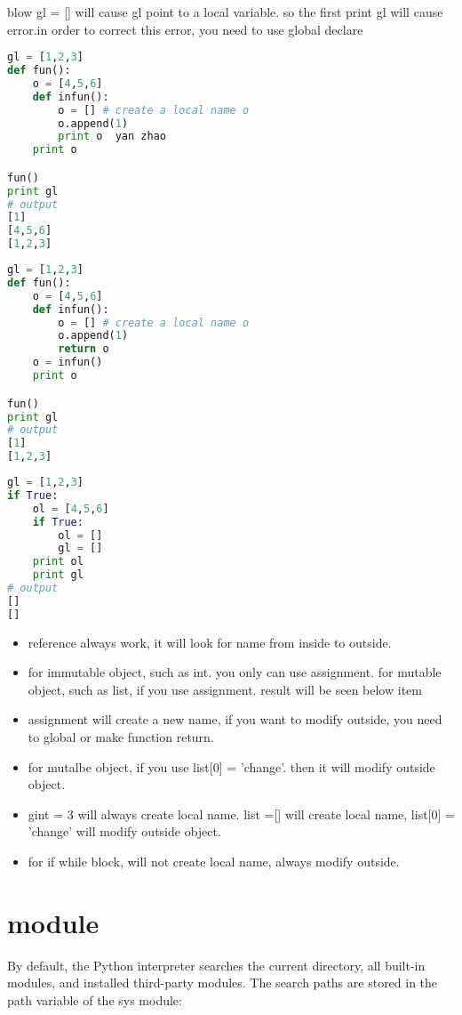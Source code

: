 \documentclass[a4paper,12pt,twoside]{book}
\begin{document}
blow gl = [] will cause gl point to a local variable. so the first print gl will cause error.in order to correct this error, you need to use global declare

\begin{lstlisting}[frame=single, language=python]
gl = [1,2,3]
def fun():
	o = [4,5,6]
	def infun():
		o = [] # create a local name o
		o.append(1)
		print o  yan zhao
	print o

fun()
print gl
# output 
[1]
[4,5,6]
[1,2,3]
\end{lstlisting}  

\begin{lstlisting}[frame=single, language=python]
gl = [1,2,3]
def fun():
	o = [4,5,6]
	def infun():
		o = [] # create a local name o
		o.append(1)
		return o
	o = infun()
	print o

fun()
print gl
# output 
[1]
[1,2,3]
\end{lstlisting}  


\begin{lstlisting}[frame=single, language=python]
gl = [1,2,3]
if True:
	ol = [4,5,6]
	if True:
		ol = []
		gl = []
	print ol
	print gl
# output 
[]
[]
\end{lstlisting}  

\begin{itemize}
		\item reference always work, it will look for name from inside to outside.
		\item for immutable object, such as int. you only can use assignment. for mutable object, such as list, if you use assignment. result will be seen below item
		\item assignment will create a new name, if you want to modify outside, you need to global or make function return.
		\item for mutalbe object, if you use list[0] = 'change'. then it will modify outside object.
		\item gint = 3 will always create local name. list =[] will create local name, list[0] = 'change' will modify outside object.
		\item for if while block, will not create local name, always modify outside. 
\end{itemize}

\section{module}

By default, the Python interpreter searches the current directory, all built-in modules, and installed third-party modules. The search paths are stored in the path variable of the sys module:
\end{document}
